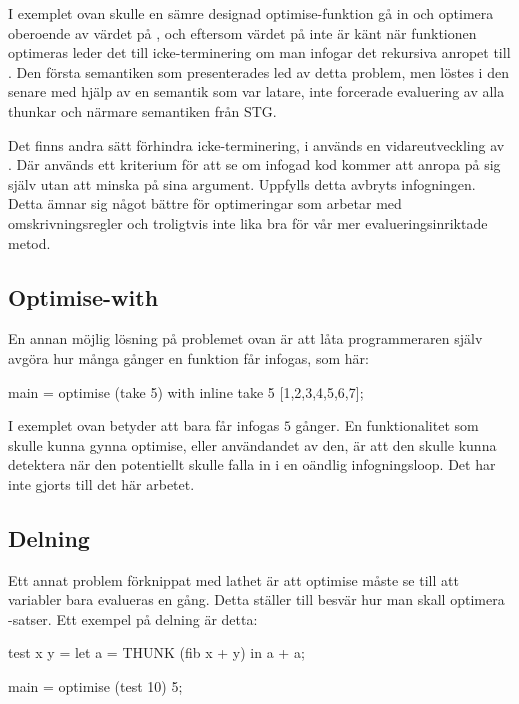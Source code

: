 \documentclass[Rapport]{subfiles}
\begin{document}
I exemplet ovan skulle en sämre designad optimise-funktion gå in och optimera  oberoende av värdet på
, och eftersom värdet på  inte är känt när funktionen optimeras leder det till
icke-terminering om man infogar det rekursiva anropet till .
    Den första semantiken som presenterades led av detta problem, men löstes i den senare med hjälp av
en semantik som var latare, inte forcerade evaluering av alla thunkar och närmare semantiken från STG.

Det finns andra sätt förhindra icke-terminering, i \cite{mitchell2007supercompiler} 
används en vidareutveckling av \cite{home-emb}. Där används ett kriterium för att se om infogad kod kommer att anropa på sig själv utan att minska på sina argument. Uppfylls detta avbryts infogningen. Detta ämnar sig något bättre för optimeringar som arbetar med omskrivningsregler och troligtvis inte lika bra för vår mer evalueringsinriktade metod.



\subsection{Optimise-with}
En annan möjlig lösning på problemet ovan är att låta programmeraren själv avgöra hur
många gånger en funktion får infogas, som här:

\begin{codeEx}
main = optimise (take 5) with { inline take 5 } [1,2,3,4,5,6,7];
\end{codeEx}

I exemplet ovan betyder  att  bara får infogas $5$ gånger.
En funktionalitet som skulle kunna gynna optimise, eller användandet av den,
är att den skulle kunna detektera när den potentiellt skulle falla in i en
oändlig infogningsloop. Det har inte gjorts till det här arbetet.

\subsection{Delning}
Ett annat problem förknippat med lathet är att optimise måste se till att variabler bara 
evalueras en gång. Detta ställer till besvär hur man skall optimera -satser.
Ett exempel på delning är detta:

\begin{codeEx}
test x y = let
    { a = THUNK (fib x + y)
    } in a + a;

main = optimise (test 10) 5;
\end{codeEx}
\end{document}
